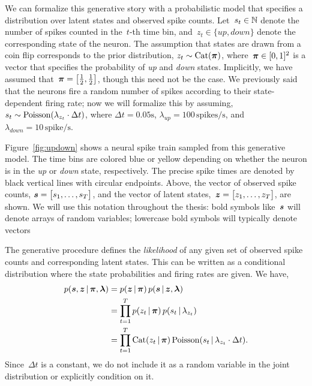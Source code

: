 \sloppy We can formalize this generative story with a probabilistic
model that specifies a distribution over latent states and observed
spike counts. Let~$s_t \in \mathbb{N}$ denote the number of spikes
counted in the~$t$-th time bin, and~$z_t \in \{\textit{up},
\textit{down}\}$ denote the corresponding state of the neuron. The
assumption that states are drawn from a coin flip corresponds to the
prior distribution, ${z_t \sim \mathrm{Cat}(\boldsymbol{\pi})}$,
where~${\boldsymbol{\pi} \in [0,1]^2}$ is a vector that specifies the probability
of \textit{up} and \textit{down} states.  Implicitly, we have assumed
that~${\boldsymbol{\pi}=\big[\tfrac{1}{2}, \tfrac{1}{2} \big]}$, though this need
not be the case.  We previously said that the neurons fire a random
number of spikes according to their state-dependent firing rate; now
we will formalize this by assuming,~${s_{t} \sim
  \mathrm{Poisson}(\lambda_{z_t} \cdot \Delta t)}$, where ${\Delta t =
  0.05\text{s}}$, ${\lambda_{\textit{up}} = 100\,\text{spikes/s}}$,
and ${\lambda_{\textit{down}} = 10\,\text{spike/s}}$.

Figure~\ref{fig:updown} shows a neural spike train sampled from this
generative model. The time bins are colored blue or yellow depending
on whether the neuron is in the \textit{up} or \textit{down} state,
respectively.  The precise spike times are denoted by black vertical
lines with circular endpoints. Above, the vector of observed spike
counts, ${\boldsymbol{s} = \big[s_1, \ldots, s_T \big]}$, and the vector of
latent states,~${\boldsymbol{z} = \big[z_1, \ldots, z_T \big]}$, are shown.  We
will use this notation throughout the thesis: bold symbols like~$\boldsymbol{s}$
will denote arrays of random variables; lowercase bold symbols will
typically denote vectors

The generative procedure defines the \emph{likelihood} of any given
set of observed spike counts and corresponding latent states. This can
be written as a conditional distribution where the state probabilities
and firing rates are given. We have,
\begin{align}
  \label{eq:lkhd_chain_rule}
  p(\boldsymbol{s}, \boldsymbol{z} \,|\, \boldsymbol{\pi}, \boldsymbol{\lambda}) 
  &= p(\boldsymbol{z} \,|\, \boldsymbol{\pi}) \, p(\boldsymbol{s} \,|\, \boldsymbol{z}, \boldsymbol{\lambda}) \\
  \label{eq:lkhd_factorized}
  &= \prod_{t=1}^T p(z_t \,|\, \boldsymbol{\pi}) \, p(s_t \,|\, \lambda_{z_t}) \\
  \label{eq:lkhd_factorized_forms}
  &= \prod_{t=1}^T \mathrm{Cat}(z_t \,|\, \boldsymbol{\pi}) \, \mathrm{Poisson}(s_t \,|\, \lambda_{z_t} \cdot \Delta t).
\end{align}
Since~$\Delta t$ is a constant, we do not include it as a random
variable in the joint distribution or explicitly condition on it.

